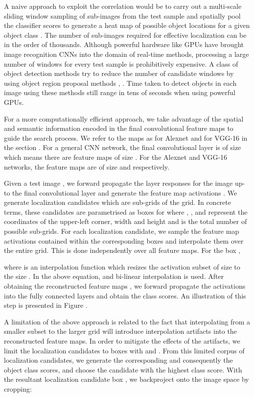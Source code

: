 \documentclass[runningheads]{llncs}
\begin{document}
A naive approach to exploit the correlation would be to carry out a multi-scale sliding window sampling of sub-images from the test sample and spatially pool the classifier scores to generate a heat map of possible object locations for a given object class . The number of sub-images required for effective localization can be in the order of thousands. Although powerful hardware like GPUs have brought image recognition CNNs  into the domain of real-time methods, processing a large number of windows for every test sample is prohibitively expensive. A class of object detection methods \cite{girshick2014rich} try to reduce the number of candidate windows by using object region proposal methods \cite{uijlings2013selective}, \cite{alexe2012measuring}. Time taken to detect objects in each image using these methods still range in tens of seconds when using powerful GPUs.

For a more computationally efficient approach, we take advantage of the spatial and semantic information encoded in the final convolutional feature maps to guide the search process. We refer to the maps as  for Alexnet and  for VGG-16 in the section . For a general CNN network, the final convolutional layer is of size  which means there are  feature maps of size . For the Alexnet and VGG-16 networks, the feature maps are of size   and  respectively.

Given a test image , we forward propagate the layer responses for the image up-to the final convolutional layer  and generate the feature map activations . We generate localization candidates which are sub-grids of the  grid. In concrete terms, these candidates are parametrised as  boxes  for  where , ,  and  represent the coordinates of the upper-left corner, width and height and  is the total number of possible sub-grids.
For each localization candidate, we sample the feature map activations contained within the  corresponding boxes and interpolate them over the entire  grid. This is done independently over all  feature maps. For the box ,




\noindent where  is an interpolation function which resizes the activation subset of size  to the size . In the above equation,  and bi-linear interpolation is used.
After obtaining the reconstructed feature maps , we forward propagate the activations into the fully connected layers and obtain the class scores. An illustration of this step is presented in Figure .

A limitation of the above approach is related to the fact that interpolating from a smaller subset to the larger grid will introduce interpolation artifacts into the reconstructed feature maps. In order to mitigate the effects of the artifacts, we limit the localization candidates to boxes with   and . From this limited corpus of localization candidates, we generate the corresponding  and consequently the object class scores, and choose the candidate with the highest class score. With the resultant localization candidate box , we backproject onto the image space by cropping:
\end{document}
